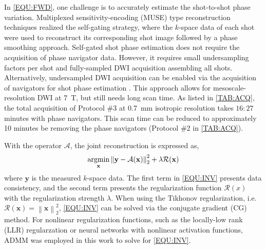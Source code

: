 \documentclass[journal,twoside,web]{ieeecolor}
\newcommand{\argmin}{\operatornamewithlimits{argmin}}
\newcommand{\norm}[1]{\left\lVert#1\right\rVert}
\begin{document}
	In \cref{EQU:FWD}, one challenge is
	to accurately estimate the shot-to-shot phase variation.
	Multiplexed sensitivity-encoding (MUSE) type reconstruction techniques
	\cite{liu_2004_diff_spiral,uecker_2009_nlinv_diff,chen_2013_muse,merrem_2019_nl_steam}
	realized the self-gating strategy,
	where the $k$-space data of each shot were used to reconstruct
	its corresponding shot image followed by a phase smoothing approach.
	Self-gated shot phase estimation does not require
	the acquisition of phase navigator data.
	However, it requires small undersampling factors per shot and
	fully-sampled DWI acquisition assembling all shots.
	Alternatively, undersampled DWI acquisition can be enabled
	via the acquisition of navigators for shot phase estimation
	\cite{tan_2024_naviepi}.
	This approach allows for mesoscale-resolution DWI at \SI{7}{\tesla},
	but still needs long scan time.
	As listed in \cref{TAB:ACQ}, the total acquisition of
	Protocol \#3 at \SI{0.7}{mm} isotropic resolution
	takes $16:27$ minutes with phase navigators.
	This scan time can be reduced to approximately 10 minutes
	be removing the phase navigators (Protocol \#2 in \cref{TAB:ACQ}).

	With the operator $\mathcal{A}$, the joint reconstruction is expressed as,
	\begin{equation}
		\argmin_{\mathbf{x}} \norm{\mathbf{y} - \mathcal{A}(\mathbf{x})}_2^2 + \lambda \mathcal{R}(\mathbf{x})
		\label{EQU:INV}
	\end{equation}
	where $\mathbf{y}$ is the measured $k$-space data.
	The first term in \cref{EQU:INV} presents data consistency, and
	the second term presents the regularization function $\mathcal{R}(x)$
	with the regularization strength $\lambda$.
	When using the Tikhonov regularization,
	i.e.~$\mathcal{R}(\mathbf{x}) = \norm{\mathbf{x}}_2^2$,
	\cref{EQU:INV} can be solved via the conjugate gradient (CG) method.
	For nonlinear regularization functions,
	such as the locally-low rank (LLR) regularzation \cite{tan_2024_naviepi} or
	neural networks with nonlinear activation functions,
	ADMM was employed in this work to solve for \cref{EQU:INV}.
\end{document}
